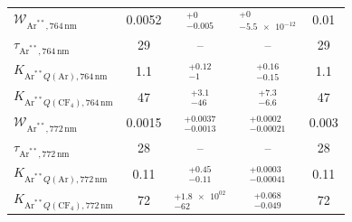 \begin{table}[htbp]
\begin{tabular}{lcccc}
$\mathcal{W}_{\mathrm{Ar}^{**},764\,\mathrm{nm}}$ & \num{0.0052} & $^{+\num{0}}_{-\num{0.005}}$ & $^{+\num{0}}_{-\num{5.5e-12}}$ & \num{0.01} \\
$\tau_{\mathrm{Ar}^{**},764\,\mathrm{nm}}$ & \num{29} & -- & -- & \num{29} \\
$K_{\mathrm{Ar}^{**}Q(\mathrm{Ar}),764\,\mathrm{nm}}$ & \num{1.1} & $^{+\num{0.12}}_{-\num{1}}$ & $^{+\num{0.16}}_{-\num{0.15}}$ & \num{1.1} \\
$K_{\mathrm{Ar}^{**}Q(\mathrm{CF}_4),764\,\mathrm{nm}}$ & \num{47} & $^{+\num{3.1}}_{-\num{46}}$ & $^{+\num{7.3}}_{-\num{6.6}}$ & \num{47} \\
$\mathcal{W}_{\mathrm{Ar}^{**},772\,\mathrm{nm}}$ & \num{0.0015} & $^{+\num{0.0037}}_{-\num{0.0013}}$ & $^{+\num{0.0002}}_{-\num{0.00021}}$ & \num{0.003} \\
$\tau_{\mathrm{Ar}^{**},772\,\mathrm{nm}}$ & \num{28} & -- & -- & \num{28} \\
$K_{\mathrm{Ar}^{**}Q(\mathrm{Ar}),772\,\mathrm{nm}}$ & \num{0.11} & $^{+\num{0.45}}_{-\num{0.11}}$ & $^{+\num{0.0003}}_{-\num{0.00041}}$ & \num{0.11} \\
$K_{\mathrm{Ar}^{**}Q(\mathrm{CF}_4),772\,\mathrm{nm}}$ & \num{72} & $^{+\num{1.8e+02}}_{-\num{62}}$ & $^{+\num{0.068}}_{-\num{0.049}}$ & \num{72} \\
\bottomrule
\end{tabular}
\end{table}
